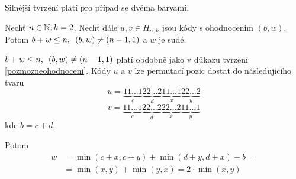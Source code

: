 Silnější tvrzení platí pro případ se dvěma barvami. 

\begin{tvrz}\label{tvrzohodnoceni2}
    Nechť $n \in \mathbb{N}, k=2$. Nechť dále $u, v \in H_{n,k}$ jsou kódy s ohodnocením $(b,w)$. Potom $b + w \leq n, \hspace{5px} (b,w) \neq (n-1,1)$ a $w$ je sudé.
\end{tvrz}
\begin{dukaz}
$b + w \leq n, \hspace{5px} (b,w) \neq (n-1,1)$ platí obdobně jako v důkazu tvrzení \ref{pozmozneohodnoceni}. Kódy $u$ a $v$ lze permutací pozic dostat do následujícího tvaru
    \[
  u = 
    \underbrace{11\dots1}_{c}
    \underbrace{22\dots2}_{d}
    \underbrace{11\dots1}_{x}
    \underbrace{22\dots2}_{y}
 \]
 \[
  v = 
    \underbrace{11\dots1}_{c}
    \underbrace{22\dots2}_{d}
    \underbrace{22\dots2}_{x}
    \underbrace{11\dots1}_{y}
 \]
 kde $b = c + d$. 

 Potom
 \begin{align*}
     w &= \min(c + x, c + y) + \min(d + y, d + x) - b =\\
     &= \min(x, y) + \min(y, x) = 2\cdot \min(x, y)
 \end{align*}

\end{dukaz}

    






